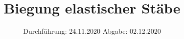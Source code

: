 

\subject{103}
\title{Biegung elastischer Stäbe}
\date{%
  Durchführung: 24.11.2020
  \hspace{3em}
  Abgabe: 02.12.2020
}



\maketitle
\thispagestyle{empty}
\tableofcontents
\newpage






\printbibliography{}



